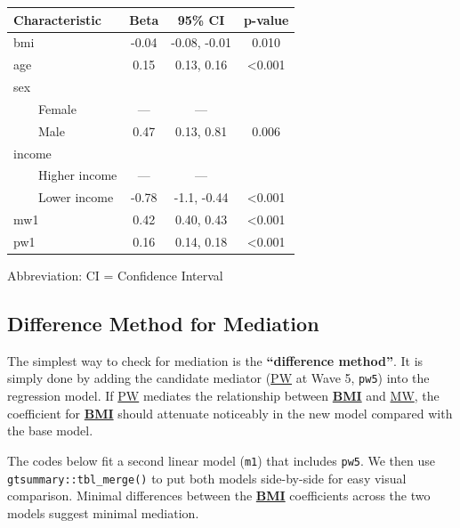 \documentclass[
]{book}
\begin{document}
\begin{table}[t]
\fontsize{12.0pt}{14.0pt}\selectfont
\begin{tabular*}{\linewidth}{@{\extracolsep{\fill}}lccc}
\toprule
\textbf{Characteristic} & \textbf{Beta} & \textbf{95\% CI} & \textbf{p-value} \\ 
\midrule\addlinespace[2.5pt]
bmi & -0.04 & -0.08, -0.01 & 0.010 \\ 
age & 0.15 & 0.13, 0.16 & <0.001 \\ 
sex &  &  &  \\ 
    Female & — & — &  \\ 
    Male & 0.47 & 0.13, 0.81 & 0.006 \\ 
income &  &  &  \\ 
    Higher income & — & — &  \\ 
    Lower income & -0.78 & -1.1, -0.44 & <0.001 \\ 
mw1 & 0.42 & 0.40, 0.43 & <0.001 \\ 
pw1 & 0.16 & 0.14, 0.18 & <0.001 \\ 
\bottomrule
\end{tabular*}
\begin{minipage}{\linewidth}
\vspace{.05em}
Abbreviation: CI = Confidence Interval\\
\end{minipage}
\end{table}

\subsection{Difference Method for Mediation}\label{difference-method-for-mediation}

The simplest way to check for mediation is the \textbf{``difference method''}. It is simply done by adding the candidate mediator (\hyperref[acronyms_PW]{PW} at Wave 5, \texttt{pw5}) into the regression model. If \hyperref[acronyms_PW]{PW} mediates the relationship between \textbf{\hyperref[acronyms_BMI]{BMI}} and \hyperref[acronyms_MW]{MW}, the coefficient for \textbf{\hyperref[acronyms_BMI]{BMI}} should attenuate noticeably in the new model compared with the base model.

The codes below fit a second linear model (\texttt{m1}) that includes \texttt{pw5}. We then use \texttt{gtsummary::tbl\_merge()} to put both models side-by-side for easy visual comparison. Minimal differences between the \textbf{\hyperref[acronyms_BMI]{BMI}} coefficients across the two models suggest minimal mediation.
\end{document}
